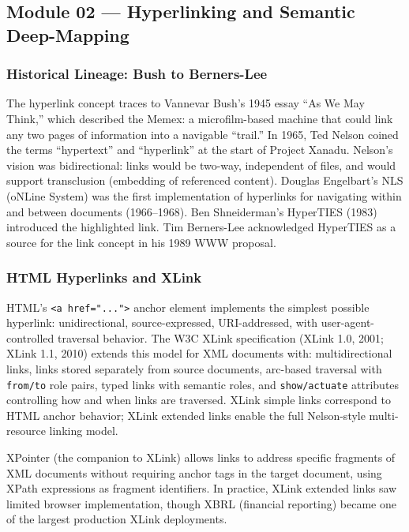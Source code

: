 \documentclass[11pt,letterpaper]{article}
\begin{document}
\subsection{Module 02 --- Hyperlinking and Semantic Deep-Mapping}

\subsubsection{Historical Lineage: Bush to Berners-Lee}

The hyperlink concept traces to Vannevar Bush's 1945 essay ``As We May Think,'' which described the Memex: a microfilm-based machine that could link any two pages of information into a navigable ``trail.'' In 1965, Ted Nelson coined the terms ``hypertext'' and ``hyperlink'' at the start of Project Xanadu. Nelson's vision was bidirectional: links would be two-way, independent of files, and would support transclusion (embedding of referenced content). Douglas Engelbart's NLS (oNLine System) was the first implementation of hyperlinks for navigating within and between documents (1966--1968). Ben Shneiderman's HyperTIES (1983) introduced the highlighted link. Tim Berners-Lee acknowledged HyperTIES as a source for the link concept in his 1989 WWW proposal.

\subsubsection{HTML Hyperlinks and XLink}

HTML's \texttt{<a href="...">} anchor element implements the simplest possible hyperlink: unidirectional, source-expressed, URI-addressed, with user-agent-controlled traversal behavior. The W3C XLink specification (XLink 1.0, 2001; XLink 1.1, 2010) extends this model for XML documents with: multidirectional links, links stored separately from source documents, arc-based traversal with \texttt{from/to} role pairs, typed links with semantic roles, and \texttt{show/actuate} attributes controlling how and when links are traversed. XLink simple links correspond to HTML anchor behavior; XLink extended links enable the full Nelson-style multi-resource linking model.

XPointer (the companion to XLink) allows links to address specific fragments of XML documents without requiring anchor tags in the target document, using XPath expressions as fragment identifiers. In practice, XLink extended links saw limited browser implementation, though XBRL (financial reporting) became one of the largest production XLink deployments.
\end{document}
